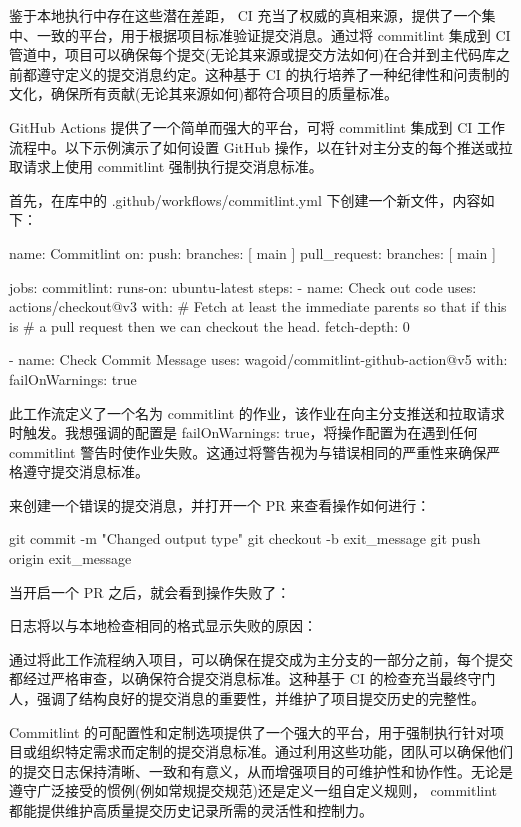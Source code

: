 鉴于本地执行中存在这些潜在差距， CI 充当了权威的真相来源，提供了一个集中、一致的平台，用于根据项目标准验证提交消息。通过将 commitlint 集成到 CI 管道中，项目可以确保每个提交(无论其来源或提交方法如何)在合并到主代码库之前都遵守定义的提交消息约定。这种基于 CI 的执行培养了一种纪律性和问责制的文化，确保所有贡献(无论其来源如何)都符合项目的质量标准。


GitHub Actions 提供了一个简单而强大的平台，可将 commitlint 集成到 CI 工作流程中。以下示例演示了如何设置 GitHub 操作，以在针对主分支的每个推送或拉取请求上使用 commitlint 强制执行提交消息标准。

首先，在库中的 .github/workflows/commitlint.yml 下创建一个新文件，内容如下：

\begin{shell}
name: Commitlint
on:
    push:
        branches: [ main ]
    pull_request:
        branches: [ main ]

jobs:
    commitlint:
        runs-on: ubuntu-latest
        steps:
        - name: Check out code
            uses: actions/checkout@v3
            with:
                # Fetch at least the immediate parents so that if this is
                # a pull request then we can checkout the head.
                fetch-depth: 0

        - name: Check Commit Message
            uses: wagoid/commitlint-github-action@v5
            with:
                failOnWarnings: true
\end{shell}

此工作流定义了一个名为 commitlint 的作业，该作业在向主分支推送和拉取请求时触发。我想强调的配置是 failOnWarnings: true，将操作配置为在遇到任何 commitlint 警告时使作业失败。这通过将警告视为与错误相同的严重性来确保严格遵守提交消息标准。

来创建一个错误的提交消息，并打开一个 PR 来查看操作如何进行：

\begin{shell}
git commit -m "Changed output type"
git checkout -b exit_message
git push origin exit_message
\end{shell}

当开启一个 PR 之后，就会看到操作失败了：


日志将以与本地检查相同的格式显示失败的原因：


通过将此工作流程纳入项目，可以确保在提交成为主分支的一部分之前，每个提交都经过严格审查，以确保符合提交消息标准。这种基于 CI 的检查充当最终守门人，强调了结构良好的提交消息的重要性，并维护了项目提交历史的完整性。

Commitlint 的可配置性和定制选项提供了一个强大的平台，用于强制执行针对项目或组织特定需求而定制的提交消息标准。通过利用这些功能，团队可以确保他们的提交日志保持清晰、一致和有意义，从而增强项目的可维护性和协作性。无论是遵守广泛接受的惯例(例如常规提交规范)还是定义一组自定义规则， commitlint 都能提供维护高质量提交历史记录所需的灵活性和控制力。







